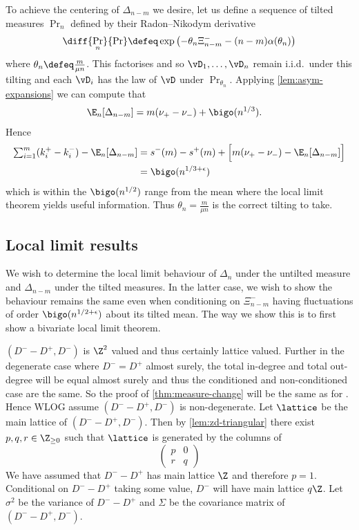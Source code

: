 To achieve the centering of $\Delta_{n-m}$ we desire, let us define a sequence of tilted measures $\Pr_n$ defined by their Radon--Nikodym derivative
\begin{equation}
    \diff{\Pr_n}{\Pr} \defeq \exp \left( - \theta_n \Xi^-_{n-m} - (n - m) \alpha(\theta_n) \right)
\end{equation}
where $\theta_n \defeq \frac{m}{\mu n}$. This factorises and so $\vD_1, \ldots, \vD_n$ remain i.i.d.\ under this tilting and each $\vD_i$ has the law of $\vD$ under $\Pr_{\theta_n}$. Applying \cref{lem:asym-expansions} we can compute that
\begin{align*}
    \E_n[\Delta_{n-m}] 
    &= m(\nu_+ - \nu_-) + \bigo(n^{1/3}).
\end{align*}
Hence
\begin{align*}
    \textstyle \sum_{i=1}^m (k_i^+ - k_i^-) - \E_n[\Delta_{n-m}] 
    &= s^-(m) - s^+(m) + \Big[ m(\nu_+ - \nu_-) - \E_n[\Delta_{n-m}] \Big] \\
    &= \bigo(n^{1/3 + \epsilon})
\end{align*}
which is within the $\bigo(n^{1/2})$ range from the mean where the local limit theorem yields useful information. Thus $\theta_n = \frac{m}{\mu n}$ is the correct tilting to take. 

\subsection{Local limit results}

We wish to determine the local limit behaviour of $\Delta_n$ under the untilted measure and $\Delta_{n-m}$ under the tilted measures. In the latter case, we wish to show the behaviour remains the same even when conditioning on $\Xi_{n-m}^-$ having fluctuations of order $\bigo(n^{1/2 + \epsilon})$ about its tilted mean. The way we show this is to first show a bivariate local limit theorem.

$(D^- - D^+, D^-)$ is $\Z^2$ valued and thus certainly lattice valued. Further in the degenerate case where $D^- = D^+$ almost surely, the total in-degree and total out-degree will be equal almost surely and thus the conditioned and non-conditioned case are the same. So the proof of \cref{thm:measure-change} will be the same as for \cite[Proposition 4.3]{conchon--kerjanStableGraphMetric2020}. Hence WLOG assume $(D^- - D^+, D^-)$ is non-degenerate. Let $\lattice$ be the main lattice of $(D^- - D^+, D^-)$. Then by \cref{lem:zd-triangular} there exist $p, q, r \in \Z_{\geq 0}$ such that $\lattice$ is generated by the columns of
\begin{equation*}
    \begin{pmatrix}
        p & 0 \\
        r & q
    \end{pmatrix}
\end{equation*}
We have assumed that $D^- - D^+$ has main lattice $\Z$ and therefore $p = 1$. Conditional on $D^- - D^+$ taking some value, $D^-$ will have main lattice $q \Z$. Let $\sigma^2$ be the variance of $D^- - D^+$ and $\Sigma$ be the covariance matrix of $(D^- - D^+, D^-)$.

